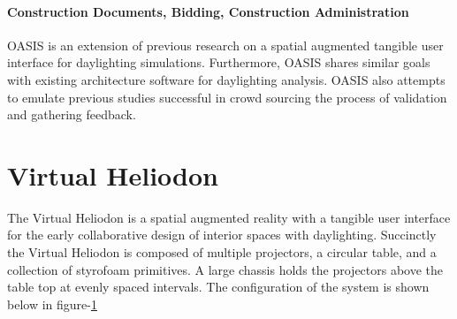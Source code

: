   \paragraph{Construction Documents, Bidding, Construction Administration} 



  OASIS is an extension of previous research on a spatial augmented tangible user interface for daylighting simulations\cite{barb,josh,yushan,everyone}.
  Furthermore, OASIS shares similar goals with existing architecture software for daylighting analysis.
  OASIS also attempts to emulate previous studies successful in crowd sourcing the process of validation and gathering feedback.

\section{Virtual Heliodon}
The Virtual Heliodon is a spatial augmented reality with a tangible user interface for the early collaborative design of interior spaces with daylighting\cite{barb, josh,yushang}. 
Succinctly the Virtual Heliodon is composed of multiple projectors, a circular table, and a collection of styrofoam primitives.  
A large chassis holds the projectors above the table top at evenly spaced intervals. The configuration of the system is shown below in figure-\ref{}





